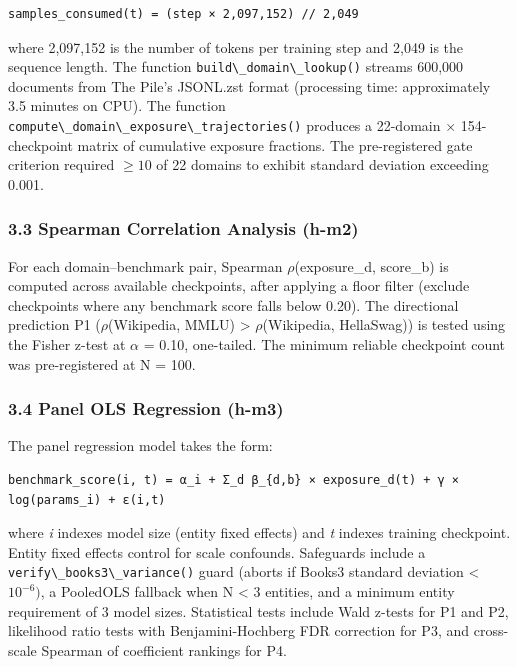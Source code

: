\begin{verbatim}
samples_consumed(t) = (step × 2,097,152) // 2,049
\end{verbatim}

where 2,097,152 is the number of tokens per training step and 2,049 is the sequence length. The function \texttt{build\textbackslash \_domain\textbackslash \_lookup()} streams 600,000 documents from The Pile's JSONL.zst format (processing time: approximately 3.5 minutes on CPU). The function \texttt{compute\textbackslash \_domain\textbackslash \_exposure\textbackslash \_trajectories()} produces a 22-domain $\times$ 154-checkpoint matrix of cumulative exposure fractions. The pre-registered gate criterion required $\geq 10$ of 22 domains to exhibit standard deviation exceeding 0.001.

\subsubsection{3.3 Spearman Correlation Analysis (h-m2)}

For each domain--benchmark pair, Spearman $\rho$(exposure\_d, score\_b) is computed across available checkpoints, after applying a floor filter (exclude checkpoints where any benchmark score falls below 0.20). The directional prediction P1 ($\rho$(Wikipedia, MMLU) > $\rho$(Wikipedia, HellaSwag)) is tested using the Fisher z-test at $\alpha$ = 0.10, one-tailed. The minimum reliable checkpoint count was pre-registered at N = 100.

\subsubsection{3.4 Panel OLS Regression (h-m3)}

The panel regression model takes the form:

\begin{verbatim}
benchmark_score(i, t) = α_i + Σ_d β_{d,b} × exposure_d(t) + γ × log(params_i) + ε(i,t)
\end{verbatim}

where \textit{i} indexes model size (entity fixed effects) and \textit{t} indexes training checkpoint. Entity fixed effects control for scale confounds. Safeguards include a \texttt{verify\textbackslash \_books3\textbackslash \_variance()} guard (aborts if Books3 standard deviation < $10^{-6})$, a PooledOLS fallback when N < 3 entities, and a minimum entity requirement of 3 model sizes. Statistical tests include Wald z-tests for P1 and P2, likelihood ratio tests with Benjamini-Hochberg FDR correction for P3, and cross-scale Spearman of coefficient rankings for P4.

